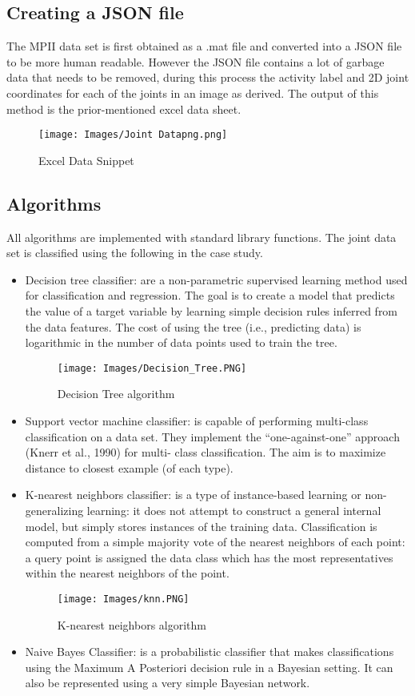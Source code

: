 \documentclass[conference]{IEEEtran}
\begin{document}
\subsection{Creating a JSON file}\label{AA}
The MPII data set is first obtained as a .mat file and converted into a JSON file to be more human readable. However the JSON file contains a lot of garbage data that needs to be removed, during this process the activity label and 2D joint coordinates for each of the joints in an image as derived. The output of this method is the prior-mentioned excel data sheet.
\begin{figure}
    \centerline{\texttt{[image: Images/Joint Datapng.png]}}
    \caption{Excel Data Snippet}
    \label{fig}
\end{figure}


\subsection{Algorithms}
All algorithms are implemented with standard library functions. The joint data set is classified using the following in the case study.
\begin{itemize}
\item Decision tree classifier: are a non-parametric supervised learning method used for classification and regression. The goal is to create a model that predicts the value of a target variable by learning simple decision rules inferred from the data features. The cost of using the tree (i.e., predicting data) is logarithmic in the number of data points used to train the tree.
\begin{figure}
\centerline{\texttt{[image: Images/Decision\_Tree.PNG]}}
\caption{Decision Tree algorithm}
\label{fig}
\end{figure}
\item Support vector machine classifier: is capable of performing multi-class classification on a data set. They implement the “one-against-one” approach (Knerr et al., 1990) for multi- class classification. The aim is to maximize distance to closest example (of each type).
\item K-nearest neighbors classifier: is a type of instance-based learning or non-generalizing learning: it does not attempt to construct a general internal model, but simply stores instances of the training data. Classification is computed from a simple majority vote of the nearest neighbors of each point: a query point is assigned the data class which has the most representatives within the nearest neighbors of the point.
\begin{figure}[h]
\centerline{\texttt{[image: Images/knn.PNG]}}
\caption{K-nearest neighbors algorithm}
\label{fig}
\end{figure}
\item Naive Bayes Classifier: is a probabilistic classifier that makes classifications using the Maximum A Posteriori decision rule in a Bayesian setting. It can also be represented using a very simple Bayesian network.
\end{itemize}
\end{document}
